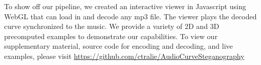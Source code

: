 \documentclass[runningheads]{llncs}
\begin{document}
To show off our pipeline, we created an interactive viewer in Javascript using WebGL that can load in and decode any mp3 file.  The viewer plays the decoded curve synchronized to the music.  We provide a variety of 2D and 3D precomputed examples to demonstrate our capabilities.  To view our supplementary material, source code for encoding and decoding, and live examples, please visit \url{https://github.com/ctralie/AudioCurveSteganography}


%
%
%


%
\end{document}
